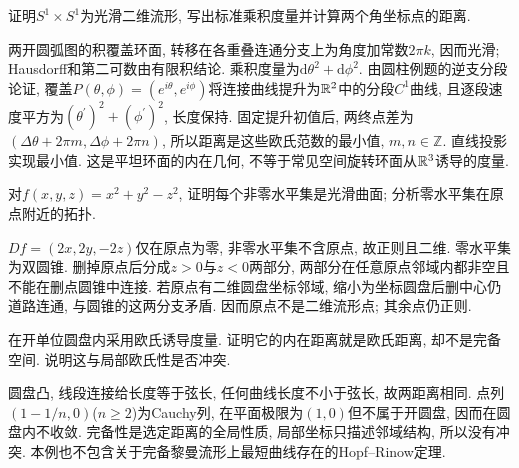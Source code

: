 \begin{exercise}
证明$S^1\times S^1$为光滑二维流形, 写出标准乘积度量并计算两个角坐标点的距离.
\end{exercise}
\begin{solution}
两开圆弧图的积覆盖环面, 转移在各重叠连通分支上为角度加常数$2\pi k$, 因而光滑; Hausdorff和第二可数由有限积结论. 乘积度量为$\mathrm d\theta^2+\mathrm d\phi^2$. 由圆柱例题的逆支分段论证, 覆盖$P(\theta,\phi)=(e^{i\theta},e^{i\phi})$将连接曲线提升为$\mathbb R^2$中的分段$C^1$曲线, 且逐段速度平方为$(\theta^{\prime})^2+(\phi^{\prime})^2$, 长度保持. 固定提升初值后, 两终点差为$(\Delta\theta+2\pi m,\Delta\phi+2\pi n)$, 所以距离是这些欧氏范数的最小值, $m,n\in\mathbb Z$. 直线投影实现最小值. 这是平坦环面的内在几何, 不等于常见空间旋转环面从$\mathbb R^3$诱导的度量.
\end{solution}
\begin{exercise}
对$f(x,y,z)=x^2+y^2-z^2$, 证明每个非零水平集是光滑曲面; 分析零水平集在原点附近的拓扑.
\end{exercise}
\begin{solution}
$Df=(2x,2y,-2z)$仅在原点为零, 非零水平集不含原点, 故正则且二维. 零水平集为双圆锥. 删掉原点后分成$z>0$与$z<0$两部分, 两部分在任意原点邻域内都非空且不能在删点圆锥中连接. 若原点有二维圆盘坐标邻域, 缩小为坐标圆盘后删中心仍道路连通, 与圆锥的这两分支矛盾. 因而原点不是二维流形点; 其余点仍正则.
\end{solution}
\begin{exercise}
在开单位圆盘内采用欧氏诱导度量. 证明它的内在距离就是欧氏距离, 却不是完备空间. 说明这与局部欧氏性是否冲突.
\end{exercise}
\begin{solution}
圆盘凸, 线段连接给长度等于弦长, 任何曲线长度不小于弦长, 故两距离相同. 点列$(1-1/n,0)$($n\ge2$)为Cauchy列, 在平面极限为$(1,0)$但不属于开圆盘, 因而在圆盘内不收敛. 完备性是选定距离的全局性质, 局部坐标只描述邻域结构, 所以没有冲突. 本例也不包含关于完备黎曼流形上最短曲线存在的Hopf--Rinow定理.
\end{solution}
